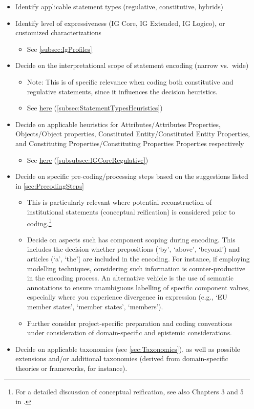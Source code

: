 \begin{itemize}
\item Identify applicable statement types (regulative, constitutive, hybrids)
\item Identify level of expressiveness (IG Core, IG Extended, IG Logico), or customized characterizations
\begin{itemize}
\item See \cref{subsec:IgProfiles}
\end{itemize}
\item Decide on the interpretational scope of statement encoding (narrow vs.~wide)
\begin{itemize}
\item Note: This is of specific relevance when coding both constitutive and regulative statements, since it influences the decision heuristics.
\item See \hyperlink{tablink:InterpretationalScopeOfInstitutionalStatements}{here} (\cref{subsec:StatementTypesHeuristics})
\end{itemize}
\item Decide on applicable heuristics for Attributes/Attributes Properties, Objects/Object properties, Constituted Entity/Constituted Entity Properties, and Constituting Properties/Constituting Properties Properties respectively
\begin{itemize}
\item See \hyperlink{tablink:AttributePropertyHeuristics}{here} (\cref{subsubsec:IGCoreRegulative})
\end{itemize}
\item Decide on specific pre-coding/processing steps based on the suggestions listed in \cref{sec:PrecodingSteps}
\begin{itemize}
\item This is particularly relevant where potential reconstruction of institutional statements (conceptual reification) is considered prior to coding.\footnote{For a detailed discussion of conceptual reification, see also Chapters 3 and 5 in \citet{Frantz2022InstitutionalGrammar}.}
\item Decide on aspects such has component scoping during encoding. This includes the decision whether prepositions (`by', `above', `beyond') and articles (`a', `the') are included in the encoding. For instance, if employing modelling techniques, considering such information is counter-productive in the encoding process. An alternative vehicle is the use of semantic annotations to ensure unambiguous labelling of specific component values, especially where you experience divergence in expression (e.g., `EU member states', `member states', `members').
\item Further consider project-specific preparation and coding conventions under consideration of domain-specific and epistemic considerations.
\end{itemize}
\item Decide on applicable taxonomies (see \cref{sec:Taxonomies}), as well as possible extensions and/or additional taxonomies (derived from domain-specific theories or frameworks, for instance).
\end{itemize}

